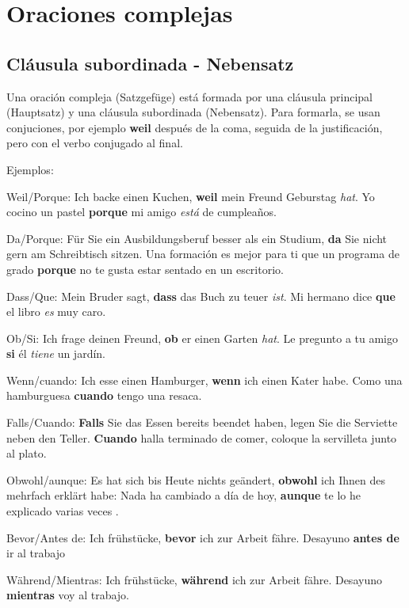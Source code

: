 \section{Oraciones complejas}
\subsection{Cláusula subordinada - Nebensatz}
Una oración compleja (Satzgefüge) está formada por una cláusula principal (Hauptsatz) y una cláusula subordinada (Nebensatz). Para formarla, se usan conjuciones, por ejemplo \textbf{weil} después de la coma, seguida de la justificación, pero con el verbo conjugado al final.

Ejemplos: 
\begin{myitemize}
\item Weil/Porque: Ich backe einen Kuchen, \textbf{weil} mein Freund Geburstag \textit{hat}. Yo cocino un pastel \textbf{porque} mi amigo \textit{está} de cumpleaños.
\item Da/Porque: Für Sie ein Ausbildungsberuf besser als ein Studium, \textbf{da} Sie nicht gern am Schreibtisch sitzen. Una formación es mejor para ti que un programa de grado \textbf{porque} no te gusta estar sentado en un escritorio.
\item Dass/Que: Mein Bruder sagt, \textbf{dass} das Buch zu teuer \textit{ist}. Mi hermano dice \textbf{que} el libro \textit{es} muy caro.
\item Ob/Si: Ich frage deinen Freund, \textbf{ob} er einen Garten \textit{hat}. Le pregunto a tu amigo \textbf{si} él \textit{tiene} un jardín.
\item Wenn/cuando: Ich esse einen Hamburger, \textbf{wenn} ich einen Kater habe. Como una hamburguesa \textbf{cuando} tengo una resaca.
\item Falls/Cuando: \textbf{Falls} Sie das Essen bereits beendet haben, legen Sie die Serviette neben den Teller. \textbf{Cuando} halla terminado de comer, coloque la servilleta junto al plato.
\item Obwohl/aunque: Es hat sich bis Heute nichts geändert, \textbf{obwohl} ich Ihnen des mehrfach erklärt habe: Nada ha cambiado a día de hoy, \textbf{aunque} te lo he explicado varias veces .
\item Bevor/Antes de: Ich frühstücke, \textbf{bevor} ich zur Arbeit fähre. Desayuno \textbf{antes de} ir al trabajo
\item Während/Mientras: Ich frühstücke, \textbf{während} ich zur Arbeit fähre. Desayuno \textbf{mientras} voy al trabajo.
\end{myitemize}

